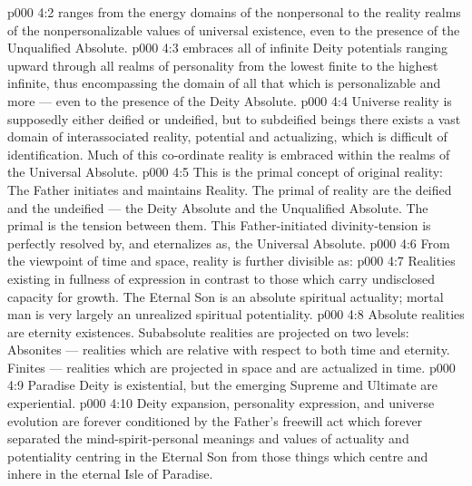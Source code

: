 \vs p000 4:2 \bibnobreakspace {} ranges from the energy domains of the nonpersonal to the reality realms of the nonpersonalizable values of universal existence, even to the presence of the Unqualified Absolute.
\vs p000 4:3 \bibnobreakspace {} embraces all of infinite Deity potentials ranging upward through all realms of personality from the lowest finite to the highest infinite, thus encompassing the domain of all that which is personalizable and more --- even to the presence of the Deity Absolute.
\vs p000 4:4 \bibnobreakspace {} Universe reality is supposedly either deified or undeified, but to subdeified beings there exists a vast domain of interassociated reality, potential and actualizing, which is difficult of identification. Much of this co\hyp{}ordinate reality is embraced within the realms of the Universal Absolute.
\vs p000 4:5 This is the primal concept of original reality: The Father initiates and maintains Reality. The primal  of reality are the deified and the undeified --- the Deity Absolute and the Unqualified Absolute. The primal  is the tension between them. This Father\hyp{}initiated divinity\hyp{}tension is perfectly resolved by, and eternalizes as, the Universal Absolute.
\vs p000 4:6 \pc From the viewpoint of time and space, reality is further divisible as:
\vs p000 4:7 \bibnobreakspace {} Realities existing in fullness of expression in contrast to those which carry undisclosed capacity for growth. The Eternal Son is an absolute spiritual actuality; mortal man is very largely an unrealized spiritual potentiality.
\vs p000 4:8 \bibnobreakspace {} Absolute realities are eternity existences. Subabsolute realities are projected on two levels: Absonites --- realities which are relative with respect to both time and eternity. Finites --- realities which are projected in space and are actualized in time.
\vs p000 4:9 \bibnobreakspace {} Paradise Deity is existential, but the emerging Supreme and Ultimate are experiential.
\vs p000 4:10 \bibnobreakspace {} Deity expansion, personality expression, and universe evolution are forever conditioned by the Father’s freewill act which forever separated the mind\hyp{}spirit\hyp{}personal meanings and values of actuality and potentiality centring in the Eternal Son from those things which centre and inhere in the eternal Isle of Paradise.
